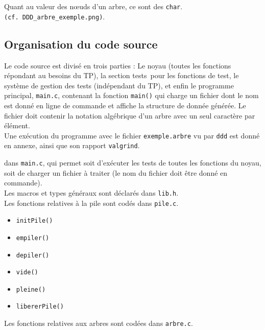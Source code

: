 \documentclass[a4paper,11pt] {article}
\begin{document}
Quant au valeur des nœuds d'un arbre, ce sont des \verb?char?.\\
\verb?(cf. DDD_arbre_exemple.png)?.

\subsection{Organisation du code source}

Le code source est divisé en trois parties : Le noyau (toutes les fonctions répondant au besoins du TP), la section \og tests\fg\ pour les fonctions de test, le système de gestion des tests (indépendant du TP), et enfin le programme principal, \verb#main.c#, contenant la fonction \verb#main()# qui charge un fichier dont le nom est donné en ligne de commande et affiche la structure de donnée générée. Le fichier doit contenir la notation algébrique d'un arbre avec un seul caractère par élément.\\

Une exécution du programme avec le fichier \verb#exemple.arbre# vu par \verb?ddd? est donné en annexe, ainsi que son rapport \verb?valgrind?.

dans \verb#main.c#, qui permet soit d'exécuter les tests de toutes les fonctions du noyau, soit de charger un fichier à traiter (le nom du fichier doit être donné en commande).\\

Les macros et types généraux sont déclarés dans \verb#lib.h#.\\

Les fonctions relatives à la pile sont codés dans \verb#pile.c#.

\vspace{0.5cm}

\begin{itemize}
	\item \verb#initPile()#
	\item \verb#empiler()#
	\item \verb#depiler()#
	\item \verb#vide()#
	\item \verb#pleine()#
	\item \verb#libererPile()#
\end{itemize}

\vspace{0.5cm}

Les fonctions relatives aux arbres sont codées dans \verb#arbre.c#.

\vspace{0.5cm}
\end{document}
